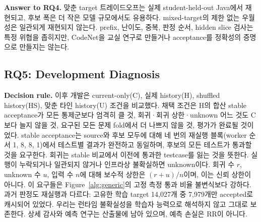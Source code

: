 \documentclass[10pt,conference]{IEEEtran}
\begin{document}
\noindent\textbf{Answer to RQ4.} 맞춘 target 트레이드오프는 실제 student-held-out Java에서 재현되고, 후보 폭은 더 작은 모델 규모에서도 유용하다. mixed-target의 제한 없는 우월성은 일관되게 재현되지 않는다. prefix, 난이도, 중복, 판정 순서, hidden slice 검사는 특정 위협을 좁히지만, CodeNet을 교실 연구로 만들거나 acceptance를 정확성의 증명으로 만들지는 않는다.

\subsection{RQ5: Development Diagnosis}
\noindent\textbf{Decision rule.} 이후 개발은 current-only(C), 실제 history(H), shuffled history(HS), 맞춘 타인 history(U) 조건을 비교했다. 채택 조건은 H의 합산 stable acceptance가 모든 통제군보다 엄격히 클 것, 회귀·회귀 상한·unknown 어느 것도 C보다 늘지 않을 것, 요구된 모든 문제 fold에서 더 나쁘지 않을 것, 평가가 완료될 것이었다. stable acceptance는 source와 후보 모두에 대해 네 번의 재실행 블록(worker 순서 1, 8, 8, 1)에서 테스트별 결과가 완전하고 동일하며, 후보의 모든 테스트가 통과할 것을 요구한다. 회귀는 stable 비교에서 이전에 통과한 testcase를 잃는 것을 뜻한다. 실행이 누락되거나 일관되지 않거나 인프라상 불확실하면 unknown이다. 회귀 수 $r$, unknown 수 $u$, 입력 수 $n$에 대해 보수적 상한은 $(r+u)/n$이며, 이는 신뢰 상한이 아니다. 이 요구들은 Figure~\ref{alg:generic}의 고정 측정 통과 비율 불변식보다 강하다. 과거 판정도 재실행과 다르다: 고유한 학습 target 14,027개 중 7,979개만 accepted로 캐시되어 있었다. 우리는 런타임 불확실성을 학습자 능력으로 해석하지 않고 그대로 보존한다. 상세 감사와 예측 연구는 산출물에 남아 있으며, 예측 손실은 RR이 아니다.
\end{document}
